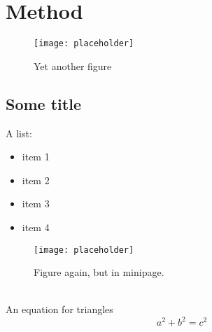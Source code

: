 \section*{Method}
\begin{figure}[H]
	\centering
	\texttt{[image: placeholder]}
	\caption{Yet another figure}
\end{figure}
\lipsum[1]

\subsection*{Some title}
\lipsum[1]


\begin{minipage}[c]{0.2\linewidth}
A list:
\begin{itemize}
	\item item 1
	\item item 2
	\item item 3
	\item item 4
\end{itemize}
\end{minipage}
\begin{minipage}[c]{0.8\linewidth}
	\begin{figure}[H]
		\centering
		\texttt{[image: placeholder]}
		\caption{Figure again, but in minipage.}
	\end{figure}
\end{minipage}
\\[0.6cm]
An equation for triangles
$$
 a^2+b^2=c^2 
$$